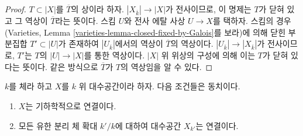\begin{proof}
$T \subset |X|$를 $\overline{T}$의 상이라 하자.
$|X_{\overline{k}}| \to |X|$가 전사이므로, 이 명제는 $T$가 닫혀 있고 그
역상이 $\overline{T}$라는 뜻이다. 스킴 $U$와 전사 에탈 사상 $U \to X$를
택하자. 스킴의 경우(Varieties, Lemma
\ref{varieties-lemma-closed-fixed-by-Galois}를 보라)에 의해 닫힌 부분집합
$T' \subset |U|$가 존재하여 $|U_{\overline{k}}|$에서의 역상이
$\overline{T}$의 역상이다.
$|U_{\overline{k}}| \to |X_{\overline{k}}|$가 전사이므로, $T'$는
$T$의 $|U| \to |X|$를 통한 역상이다. $|X|$ 위 위상의 구성에 의해 이는
$T$가 닫혀 있다는 뜻이다. 같은 방식으로 $\overline{T}$가 $T$의 역상임을
알 수 있다.
\end{proof}

\begin{lemma}
\label{lemma-characterize-geometrically-disconnected}
$k$를 체라 하고 $X$를 $k$ 위 대수공간이라 하자.
다음 조건들은 동치이다.
\begin{enumerate}
\item $X$는 기하학적으로 연결이다.
\item 모든 유한 분리 체 확대 $k'/k$에 대하여 대수공간 $X_{k'}$는
연결이다.
\end{enumerate}
\end{lemma}

